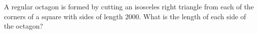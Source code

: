 A regular octagon is formed by cutting an isosceles right triangle from each of the corners of a square with sides of length $2000$. What is the length of each side of the octagon?
